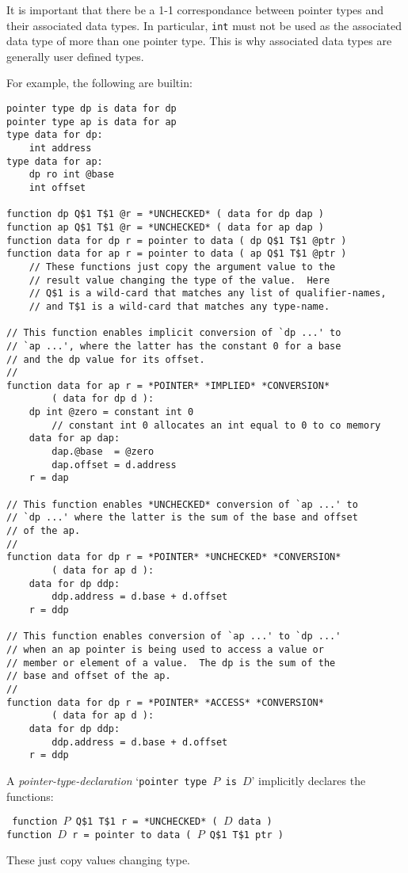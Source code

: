 \documentclass[12pt]{article}
\newenvironment{indpar}[1][0.3in]%
	{\begin{list}{}%
		     {\setlength{\itemsep}{0in}%
		      \setlength{\topsep}{0in}%
		      \setlength{\parsep}{1ex}%
		      \setlength{\labelwidth}{#1}%
		      \setlength{\leftmargin}{#1}%
		      \addtolength{\leftmargin}{\labelsep}}%
	 \item}%
	{\end{list}}
\begin{document}
It is important that there be a 1-1 correspondance between
pointer types and their associated data types.  In particular,
{\tt int} must not be used as the associated data type of
more than one pointer type.  This is why associated data types
are generally user defined types.

For example, the following are builtin:

\begin{indpar}\begin{verbatim}
pointer type dp is data for dp
pointer type ap is data for ap
type data for dp:
    int address
type data for ap:
    dp ro int @base
    int offset

function dp Q$1 T$1 @r = *UNCHECKED* ( data for dp dap )
function ap Q$1 T$1 @r = *UNCHECKED* ( data for ap dap )
function data for dp r = pointer to data ( dp Q$1 T$1 @ptr )
function data for ap r = pointer to data ( ap Q$1 T$1 @ptr )
    // These functions just copy the argument value to the
    // result value changing the type of the value.  Here
    // Q$1 is a wild-card that matches any list of qualifier-names,
    // and T$1 is a wild-card that matches any type-name.

// This function enables implicit conversion of `dp ...' to
// `ap ...', where the latter has the constant 0 for a base
// and the dp value for its offset.
// 
function data for ap r = *POINTER* *IMPLIED* *CONVERSION*
        ( data for dp d ):
    dp int @zero = constant int 0
        // constant int 0 allocates an int equal to 0 to co memory
    data for ap dap:
        dap.@base  = @zero
        dap.offset = d.address
    r = dap

// This function enables *UNCHECKED* conversion of `ap ...' to
// `dp ...' where the latter is the sum of the base and offset
// of the ap.
//
function data for dp r = *POINTER* *UNCHECKED* *CONVERSION*
        ( data for ap d ):
    data for dp ddp:
        ddp.address = d.base + d.offset
    r = ddp

// This function enables conversion of `ap ...' to `dp ...'
// when an ap pointer is being used to access a value or
// member or element of a value.  The dp is the sum of the
// base and offset of the ap.
//
function data for dp r = *POINTER* *ACCESS* *CONVERSION*
        ( data for ap d ):
    data for dp ddp:
        ddp.address = d.base + d.offset
    r = ddp
\end{verbatim}\end{indpar}

A {\em pointer-type-declaration} `{\tt pointer type $P$ is $D$}'
implicitly declares the functions:
\begin{indpar} \tt
function $P$ Q\$1 T\$1 r = *UNCHECKED* ( $D$ data ) \\
function $D$ r = pointer to data ( $P$ Q\$1 T\$1 ptr )
\end{indpar}
These just copy values changing type.
\end{document}
